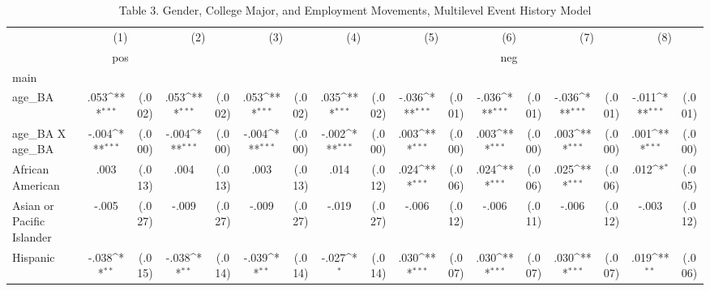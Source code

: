 \begin{table}[htbp]\centering
\def\sym#1{\ifmmode^{#1}\else\(^{#1}\)\fi}
\caption{Table 3. Gender, College Major, and Employment Movements, Multilevel Event History Model}
\begin{tabular}{l*{8}{cc}}
\hline\hline
                &\multicolumn{2}{c}{(1)}     &\multicolumn{2}{c}{(2)}     &\multicolumn{2}{c}{(3)}     &\multicolumn{2}{c}{(4)}     &\multicolumn{2}{c}{(5)}     &\multicolumn{2}{c}{(6)}     &\multicolumn{2}{c}{(7)}     &\multicolumn{2}{c}{(8)}     \\
                &\multicolumn{2}{c}{pos}     &\multicolumn{2}{c}{}        &\multicolumn{2}{c}{}        &\multicolumn{2}{c}{}        &\multicolumn{2}{c}{}        &\multicolumn{2}{c}{neg}     &\multicolumn{2}{c}{}        &\multicolumn{2}{c}{}        \\
\hline
main            &                  &         &                  &         &                  &         &                  &         &                  &         &                  &         &                  &         &                  &         \\
age\_BA          &     .053\sym{***}&   (.002)&     .053\sym{***}&   (.002)&     .053\sym{***}&   (.002)&     .035\sym{***}&   (.002)&    -.036\sym{***}&   (.001)&    -.036\sym{***}&   (.001)&    -.036\sym{***}&   (.001)&    -.011\sym{***}&   (.001)\\
age\_BA X age\_BA &    -.004\sym{***}&   (.000)&    -.004\sym{***}&   (.000)&    -.004\sym{***}&   (.000)&    -.002\sym{***}&   (.000)&     .003\sym{***}&   (.000)&     .003\sym{***}&   (.000)&     .003\sym{***}&   (.000)&     .001\sym{***}&   (.000)\\
African American&     .003         &   (.013)&     .004         &   (.013)&     .003         &   (.013)&     .014         &   (.012)&     .024\sym{***}&   (.006)&     .024\sym{***}&   (.006)&     .025\sym{***}&   (.006)&     .012\sym{*}  &   (.005)\\
Asian or Pacific Islander&    -.005         &   (.027)&    -.009         &   (.027)&    -.009         &   (.027)&    -.019         &   (.027)&    -.006         &   (.012)&    -.006         &   (.011)&    -.006         &   (.012)&    -.003         &   (.012)\\
Hispanic        &    -.038\sym{**} &   (.015)&    -.038\sym{**} &   (.014)&    -.039\sym{**} &   (.014)&    -.027\sym{*}  &   (.014)&     .030\sym{***}&   (.007)&     .030\sym{***}&   (.007)&     .030\sym{***}&   (.007)&     .019\sym{**} &   (.006)\\

\end{tabular}
\end{table}
